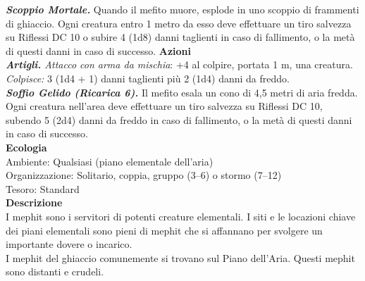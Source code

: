 \begin{multicols}{2}
\emph{\textbf{Scoppio Mortale.}} Quando il mefito muore, esplode in uno scoppio di frammenti di ghiaccio. Ogni creatura entro 1 metro da esso deve effettuare un tiro salvezza su Riflessi DC 10 o subire 4 (1d8) danni taglienti in caso di fallimento, o la metà di questi danni in caso di successo.
\smallskip\textbf{Azioni}\\
\emph{\textbf{Artigli.} Attacco con arma da mischia}: +4 al colpire, portata 1 m, una creatura.\\
\emph{Colpisce:} 3 (1d4 + 1) danni taglienti più 2 (1d4) danni da freddo.\\
\emph{\textbf{Soffio Gelido (Ricarica 6).}} Il mefito esala un cono di 4,5 metri di aria fredda. Ogni creatura nell'area deve effettuare un tiro salvezza su Riflessi DC 10, subendo 5 (2d4) danni da freddo in caso di fallimento, o la metà di questi danni in caso di successo.\\
\textbf{Ecologia}\\
Ambiente: Qualsiasi (piano elementale dell'aria)\\
Organizzazione: Solitario, coppia, gruppo (3–6) o stormo (7–12)\\
Tesoro: Standard\\
\textbf{Descrizione}\\
I mephit sono i servitori di potenti creature elementali. I siti e le locazioni chiave dei piani elementali sono pieni di mephit che si affannano per svolgere un importante dovere o incarico.\\

I mephit del ghiaccio comunemente si trovano sul Piano dell'Aria. Questi mephit sono distanti e crudeli.\\


\end{multicols}
